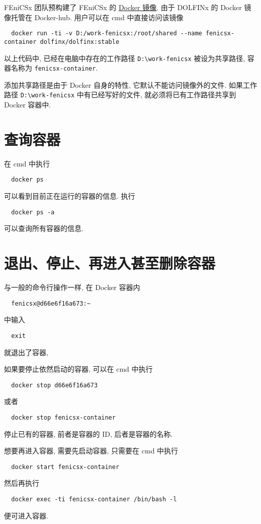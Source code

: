 \documentclass[fontset=founder]{ctexrep}
\begin{document}
FEniCSx 团队预构建了 FEniCSx 的 \href{https://hub.docker.com/u/dolfinx}{Docker 镜像}.
由于 DOLFINx 的 Docker 镜像托管在 Docker-hub.
用户可以在 \textsf{cmd} 中直接访问该镜像
\begin{lstlisting}
  docker run -ti -v D:/work-fenicsx:/root/shared --name fenicsx-container dolfinx/dolfinx:stable
\end{lstlisting}
以上代码中,
已经在电脑中存在的工作路径 \texttt{D:\textbackslash work-fenicsx} 被设为共享路径,
容器名称为 \texttt{fenicsx-container}.

添加共享路径是由于 Docker 自身的特性,
它默认不能访问镜像外的文件.
如果工作路径 \texttt{D:\textbackslash work-fenicsx} 中有已经写好的文件,
就必须将已有工作路径共享到 Docker 容器中.

\section{查询容器}

在 \textsf{cmd} 中执行
\begin{lstlisting}
  docker ps
\end{lstlisting}
可以看到目前正在运行的容器的信息.
执行
\begin{lstlisting}
  docker ps -a
\end{lstlisting}
可以查询所有容器的信息.

\section{退出、停止、再进入甚至删除容器}

与一般的命令行操作一样,
在 Docker 容器内
\begin{lstlisting}
  fenicsx@d66e6f16a673:~
\end{lstlisting}
中输入
\begin{lstlisting}
  exit
\end{lstlisting}
就退出了容器,

如果要停止依然启动的容器,
可以在 \textsf{cmd} 中执行
\begin{lstlisting}
  docker stop d66e6f16a673
\end{lstlisting}
或者
\begin{lstlisting}
  docker stop fenicsx-container
\end{lstlisting}
停止已有的容器,
前者是容器的 ID,
后者是容器的名称.

想要再进入容器,
需要先启动容器,
只需要在 \textsf{cmd} 中执行
\begin{lstlisting}
  docker start fenicsx-container
\end{lstlisting}
然后再执行
\begin{lstlisting}
  docker exec -ti fenicsx-container /bin/bash -l
\end{lstlisting}
便可进入容器.
\end{document}
